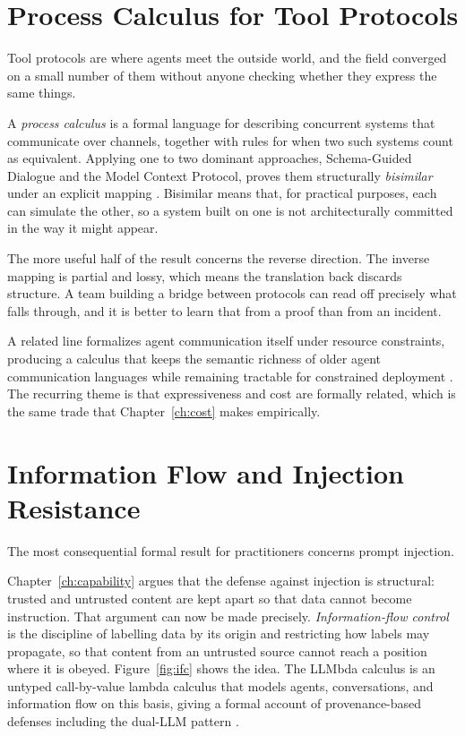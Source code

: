 \documentclass[11pt]{book}
\begin{document}
\section{Process Calculus for Tool Protocols}

Tool protocols are where agents meet the outside world, and the field converged on a small number of them without anyone checking whether they express the same things.

A \emph{process calculus} is a formal language for describing concurrent systems that communicate over channels, together with rules for when two such systems count as equivalent. Applying one to two dominant approaches, Schema-Guided Dialogue and the Model Context Protocol, proves them structurally \emph{bisimilar} under an explicit mapping \cite{toolcalculus2026}. Bisimilar means that, for practical purposes, each can simulate the other, so a system built on one is not architecturally committed in the way it might appear.

The more useful half of the result concerns the reverse direction. The inverse mapping is partial and lossy, which means the translation back discards structure. A team building a bridge between protocols can read off precisely what falls through, and it is better to learn that from a proof than from an incident.

A related line formalizes agent communication itself under resource constraints, producing a calculus that keeps the semantic richness of older agent communication languages while remaining tractable for constrained deployment \cite{uacp2026}. The recurring theme is that expressiveness and cost are formally related, which is the same trade that Chapter~\ref{ch:cost} makes empirically.

\section{Information Flow and Injection Resistance}

The most consequential formal result for practitioners concerns prompt injection.

Chapter~\ref{ch:capability} argues that the defense against injection is structural: trusted and untrusted content are kept apart so that data cannot become instruction. That argument can now be made precisely. \emph{Information-flow control} is the discipline of labelling data by its origin and restricting how labels may propagate, so that content from an untrusted source cannot reach a position where it is obeyed. Figure~\ref{fig:ifc} shows the idea. The LLMbda calculus is an untyped call-by-value lambda calculus that models agents, conversations, and information flow on this basis, giving a formal account of provenance-based defenses including the dual-LLM pattern \cite{llmbda2026}.
\end{document}
